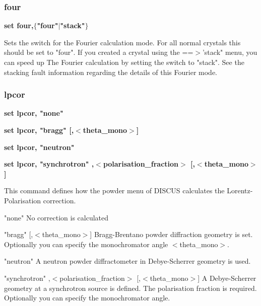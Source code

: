 \subsubsection{four}
{\bf set four,$ \{$"four"$| $"stack"$\} $ \par }
\par
\vspace{3pt}
Sets the switch for the Fourier calculation mode. 
For all normal crystals this should be set to "four". 
If you created a crystal using the ==$> $'stack" menu, you can speed up 
The Fourier calculation by setting the switch to "stack". See the 
stacking fault information regarding the details of this Fourier mode. 
\subsubsection{lpcor}
{\bf set lpcor, "none" \par }
{\bf set lpcor, "bragg" [,$ <$theta\_mono$> $] \par }
{\bf set lpcor, "neutron" \par }
{\bf set lpcor, "synchrotron" ,$ <$polarisation\_fraction$> $ [,$ <$theta\_mono$> $] \par }
\par
\vspace{3pt}
This command defines how the powder menu of DISCUS calculates the 
Lorentz-Polarisation correction. 
\par
"none" 
No correction is calculated 
\par
"bragg" [,$ <$theta\_mono$> $] 
Bragg-Brentano powder diffraction geometry is set. Optionally you can 
specify the monochromator angle $ <$theta\_mono$> $. 
\par
"neutron" 
A neutron powder diffractometer in Debye-Scherrer geometry is used. 
\par
"synchrotron" ,$ <$polarisation\_fraction$> $ [,$ <$theta\_mono$> $] 
A Debye-Scherrer geometry at a synchrotron source is defined. 
The polarisation fraction is required. 
Optionally you can specify the monochromator angle. 
